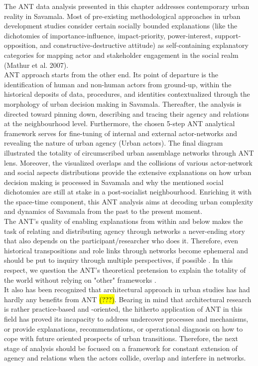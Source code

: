\documentclass[11pt]{report}
\begin{document}
The ANT data analysis presented in this chapter addresses contemporary urban reality in Savamala.
Most of pre-existing methodological approaches in urban development studies consider certain socially bounded explanations (like the dichotomies of importance-influence, impact-priority, power-interest, support-opposition, and constructive-destructive attitude) as self-containing explanatory categories for mapping actor and stakeholder engagement in the social realm (Mathur et al. 2007).
\\
ANT approach starts from the other end.
Its point of departure is the identification of human and non-human actors from ground-up, within the historical deposits of data, procedures, and identities contextualized through the morphology of urban decision making in Savamala.
Thereafter, the analysis is directed toward pinning down, describing and tracing  their agency and relations at the neighbourhood level.
Furthermore, the chosen 5-step ANT analytical framework serves for fine-tuning of internal and external actor-networks and revealing the nature of urban agency (Urban actors).
The final diagram illustrated the totality of circumscribed urban assemblage networks through ANT lens.
Moreover, the visualized overlaps and the collisions of various actor-network and social aspects distributions provide the extensive explanations on how urban decision making is processed in Savamala and why the mentioned social dichotomies are still at stake in a post-socialist neighbourhood.
Enriching it with the space-time component, this ANT analysis
aims at decoding urban complexity and dynamics of Savamala from the past to the present moment.
\\
The ANT's quality of enabling explanations from within and below makes the task of relating and distributing agency through networks a never-ending story that also depends on the participant/researcher who does it. Therefore, even historical transpositions and role links through networks become ephemeral and should be put to inquiry through multiple perspectives, if possible \cite{(Latour 2005, pp.256-257)}. In this respect, we question the ANT’s theoretical pretension to explain the totality of the world without relying on "other" frameworks \cite{(Lee and Brown 1994, Gad and Jensen 2010)}.
\\
It also has been recognized that architectural approach in urban studies has had hardly any benefits from ANT \hl{(???)}.
Bearing in mind that architectural research is rather practice-based and -oriented,
the hitherto application of ANT in this field has proved its incapacity to address undercover processes and mechanisms, or provide explanations, recommendations, or operational diagnosis on how to cope with future oriented prospects of urban transitions.
Therefore, the next stage of analysis should be focused on a framework for constant extension of agency and relations when the actors collide, overlap and interfere in networks. 
\end{document}
